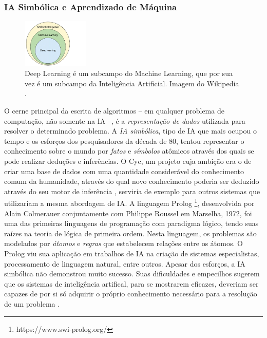 \documentclass[12pt, a4paper]{article}
\begin{document}
\subsubsection{IA Simbólica e Aprendizado de Máquina}
\begin{figure}
	\begin{center}
		\includegraphics[width=0.28\textwidth]{fig/ml_venn}
	\end{center}
	\caption{
		Deep Learning é um subcampo do Machine Learning, que por sua vez é um subcampo da Inteligência Artificial.
		Imagem do Wikipedia
		\cite{wikipedia_ml}.
	}
\end{figure}
O cerne principal da escrita de algoritmos -- em qualquer problema de computação, não somente na IA --, 
é a \emph{representação de dados} utilizada para resolver o determinado problema. A \emph{IA simbólica},
tipo de IA que mais ocupou o tempo e os esforços dos pesquisadores da década de 80, tentou representar o conhecimento
sobre o mundo por \emph{fatos} e \emph{símbolos} atômicos através dos quais se pode realizar deduções e inferências. 
O Cyc, um projeto cuja ambição era o de criar uma
base de dados com uma quantidade considerável do conhecimento comum da humanidade, através do qual
novo conhecimento poderia ser deduzido através do seu motor de inferência \cite{cyc}, serviria de exemplo para outros sistemas
que utilizariam a mesma abordagem de IA. A linguagem Prolog \footnote{https://www.swi-prolog.org/}, 
desenvolvida por Alain Colmerauer conjuntamente com Philippe Roussel em Marselha, 1972, 
foi uma das primeiras linguagens de programação com paradigma lógico, tendo suas raízes na teoria de lógica de primeira ordem.
Nesta linguagem, os problemas são modelados por \emph{átomos} e \emph{regras} que estabelecem relações entre os átomos.
O Prolog viu sua aplicação em trabalhos de IA na criação de sistemas especialistas, processamento de linguagem natural, entre outros. 
Apesar dos esforços, a IA simbólica não demonstrou muito sucesso. Suas dificuldades e empecilhos sugerem que os sistemas de inteligência
artifical, para se mostrarem eficazes, deveriam ser capazes de por si só adquirir o próprio conhecimento necessário
para a resolução de um problema \cite{Goodfellow-et-al-2016}.
\end{document}
